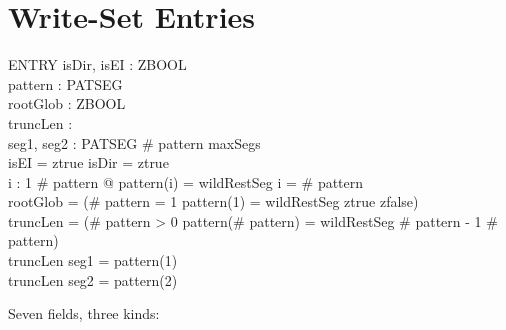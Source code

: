 \documentclass[a4paper,10pt,fleqn]{article}
\begin{document}
\section{Write-Set Entries}
\label{sec:state}

\begin{schema}{ENTRY}
isDir, isEI : ZBOOL \\
pattern : \seq PATSEG \\
rootGlob : ZBOOL \\
truncLen : \nat \\
seg1, seg2 : PATSEG
\where
\# pattern \leq maxSegs \\
isEI = ztrue \implies isDir = ztrue \\
\forall i : 1 \upto \# pattern @ pattern(i) = wildRestSeg \implies i = \# pattern \\
rootGlob = (\IF \# pattern = 1 \land pattern(1) = wildRestSeg \THEN ztrue \ELSE zfalse) \\
truncLen = (\IF \# pattern > 0 \land pattern(\# pattern) = wildRestSeg
             \THEN \# pattern - 1 \ELSE \# pattern) \\
truncLen  \implies seg1 = pattern(1) \\
truncLen  \implies seg2 = pattern(2)
\end{schema}

Seven fields, three kinds:
\end{document}
